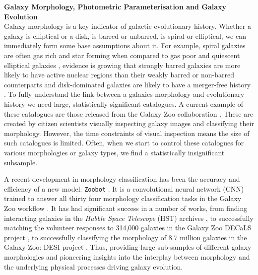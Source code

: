 \documentclass[11pt]{article}
\begin{document}
\vspace{-5mm}
\justification
\vspace{-3mm}
\noindent\textbf{Galaxy Morphology, Photometric Parameterisation and Galaxy Evolution} \\
Galaxy morphology is a key indicator of galactic evolutionary history. Whether a galaxy is elliptical or a disk, is barred or unbarred, is spiral or elliptical, we can immediately form some base assumptions about it. For example, spiral galaxies are often gas rich and star forming when compared to gas poor and quiescent elliptical galaxies \citep{2022MNRAS.510.4126S}, evidence is growing that strongly barred galaxies are more likely to have active nuclear regions than their weakly barred or non-barred counterparts \citep{izzy..paper} and disk-dominated galaxies are likely to have a merger-free history \citep{2017MNRAS.470.1559S}. To fully understand the link between a galaxies morphology and evolutionary history we need large, statistically significant catalogues. A current example of these catalogues are those released from the Galaxy Zoo collaboration \cite{2008MNRAS.389.1179L}. These are created by citizen scientists visually inspecting galaxy images and classifying their morphology. However, the time constraints of visual inspection means the size of such catalogues is limited. Often, when we start to control these catalogues for various morphologies or galaxy types, we find a statistically insignificant subsample.

A recent development in morphology classification has been the accuracy and efficiency of a new model: \texttt{Zoobot} \cite{2023JOSS....8.5312W}. It is a convolutional neural network (CNN) trained to answer all thirty four morphology classification tasks in the Galaxy Zoo workflow \citep[e.g. Fig 4 of ][]{2022MNRAS.509.3966W}. It has had significant success in a number of works, from finding interacting galaxies in the \textit{Hubble Space Telescope} (HST) archives \cite{2023ApJ...948...40O}, to successfully matching the volunteer responses to 314,000 galaxies in the Galaxy Zoo DECaLS project \cite{2022MNRAS.509.3966W}, to successfully classifying the morphology of 8.7 million galaxies in the Galaxy Zoo: DESI project \cite{mikes..paper}. Thus, providing large sub-samples of different galaxy morphologies and pioneering insights into the interplay between morphology and the underlying physical processes driving galaxy evolution. 
\end{document}
